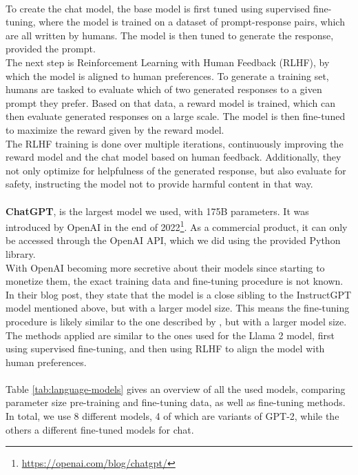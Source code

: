 \\
To create the chat model, the base model is first tuned using supervised fine-tuning, where the model is trained on a dataset of prompt-response pairs, which are all written by humans.
The model is then tuned to generate the response, provided the prompt.
\\
The next step is Reinforcement Learning with Human Feedback (RLHF), by which the model is aligned to human preferences. 
To generate a training set, humans are tasked to evaluate which of two generated responses to a given prompt they prefer.
Based on that data, a reward model is trained, which can then evaluate generated responses on a large scale.
The model is then fine-tuned to maximize the reward given by the reward model.
\\
The RLHF training is done over multiple iterations, continuously improving the reward model and the chat model based on human feedback.
Additionally, they not only optimize for helpfulness of the generated response, but also evaluate for safety, instructing the model not to provide harmful content in that way.
\\
\\
\textbf{ChatGPT}, is the largest model we used, with 175B parameters. 
It was introduced by OpenAI in the end of 2022\footnote{\url{https://openai.com/blog/chatgpt/}}.
As a commercial product, it can only be accessed through the OpenAI API, which we did using the provided Python library.
\\
With OpenAI becoming more secretive about their models since starting to monetize them, the exact training data and fine-tuning procedure is not known.
In their blog post, they state that the model is a close sibling to the InstructGPT model mentioned above, but with a larger model size.
This means the fine-tuning procedure is likely similar to the one described by \cite{ouyang:2022}, but with a larger model size.
The methods applied are similar to the ones used for the Llama 2 model, first using supervised fine-tuning, and then using RLHF to align the model with human preferences.
\\
\\
Table \ref{tab:language-models} gives an overview of all the used models, comparing parameter size pre-training and fine-tuning data, as well as fine-tuning methods.
In total, we use 8 different models, 4 of which are variants of GPT-2, while the others a different fine-tuned models for chat.
